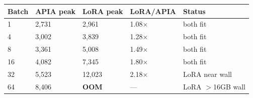 \begin{tabular}{lllll}
\toprule
Batch & APIA peak & LoRA peak & LoRA/APIA & Status \\
\midrule
1 & 2,731 & 2,961 & 1.08$\times$ & both fit \\
4 & 3,002 & 3,839 & 1.28$\times$ & both fit \\
8 & 3,361 & 5,008 & 1.49$\times$ & both fit \\
16 & 4,082 & 7,345 & 1.80$\times$ & both fit \\
32 & 5,523 & 12,023 & 2.18$\times$ & LoRA near wall \\
64 & 8,406 & \textbf{OOM} & --- & LoRA $>$16GB wall \\
\bottomrule
\end{tabular}
